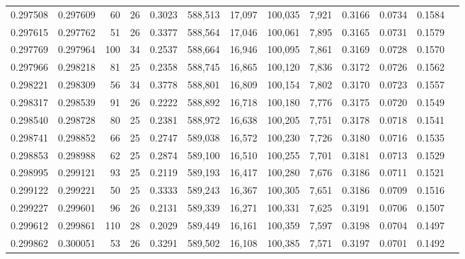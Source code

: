 \begin{tabular}{rrrrrrrrrrrrr}
0.297508 & 0.297609 &  60 &  26 &                                     0.3023 & 588,513 &  17,097 & 100,035 &   7,921 & 0.3166 & 0.0734 & 0.1584 \\
0.297615 & 0.297762 &  51 &  26 &                                     0.3377 & 588,564 &  17,046 & 100,061 &   7,895 & 0.3165 & 0.0731 & 0.1579 \\
0.297769 & 0.297964 & 100 &  34 &                                     0.2537 & 588,664 &  16,946 & 100,095 &   7,861 & 0.3169 & 0.0728 & 0.1570 \\
0.297966 & 0.298218 &  81 &  25 &                                     0.2358 & 588,745 &  16,865 & 100,120 &   7,836 & 0.3172 & 0.0726 & 0.1562 \\
0.298221 & 0.298309 &  56 &  34 &                                     0.3778 & 588,801 &  16,809 & 100,154 &   7,802 & 0.3170 & 0.0723 & 0.1557 \\
0.298317 & 0.298539 &  91 &  26 &                                     0.2222 & 588,892 &  16,718 & 100,180 &   7,776 & 0.3175 & 0.0720 & 0.1549 \\
0.298540 & 0.298728 &  80 &  25 &                                     0.2381 & 588,972 &  16,638 & 100,205 &   7,751 & 0.3178 & 0.0718 & 0.1541 \\
0.298741 & 0.298852 &  66 &  25 &                                     0.2747 & 589,038 &  16,572 & 100,230 &   7,726 & 0.3180 & 0.0716 & 0.1535 \\
0.298853 & 0.298988 &  62 &  25 &                                     0.2874 & 589,100 &  16,510 & 100,255 &   7,701 & 0.3181 & 0.0713 & 0.1529 \\
0.298995 & 0.299121 &  93 &  25 &                                     0.2119 & 589,193 &  16,417 & 100,280 &   7,676 & 0.3186 & 0.0711 & 0.1521 \\
0.299122 & 0.299221 &  50 &  25 &                                     0.3333 & 589,243 &  16,367 & 100,305 &   7,651 & 0.3186 & 0.0709 & 0.1516 \\
0.299227 & 0.299601 &  96 &  26 &                                     0.2131 & 589,339 &  16,271 & 100,331 &   7,625 & 0.3191 & 0.0706 & 0.1507 \\
0.299612 & 0.299861 & 110 &  28 &                                     0.2029 & 589,449 &  16,161 & 100,359 &   7,597 & 0.3198 & 0.0704 & 0.1497 \\
0.299862 & 0.300051 &  53 &  26 &                                     0.3291 & 589,502 &  16,108 & 100,385 &   7,571 & 0.3197 & 0.0701 & 0.1492 \\

\end{tabular}
